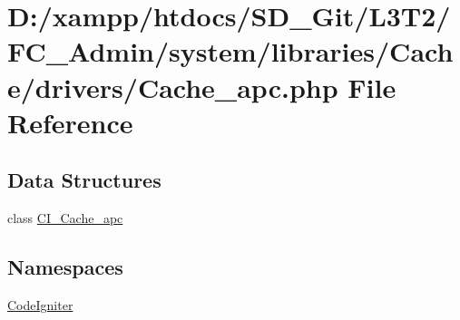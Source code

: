 \hypertarget{_cache__apc_8php}{}\section{D\+:/xampp/htdocs/\+S\+D\+\_\+\+Git/\+L3\+T2/\+F\+C\+\_\+\+Admin/system/libraries/\+Cache/drivers/\+Cache\+\_\+apc.php File Reference}
\label{_cache__apc_8php}
\subsection*{Data Structures}
\begin{DoxyCompactItemize}
\item 
class \hyperlink{class_c_i___cache__apc}{C\+I\+\_\+\+Cache\+\_\+apc}
\end{DoxyCompactItemize}
\subsection*{Namespaces}
\begin{DoxyCompactItemize}
\item 
 \hyperlink{namespace_code_igniter}{Code\+Igniter}
\end{DoxyCompactItemize}
